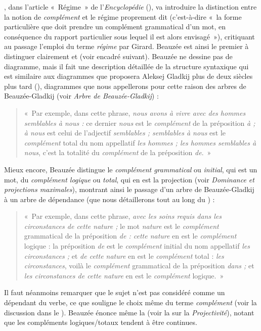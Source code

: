 {    , dans l’article «~Régime~» de l’\textit{Encyclopédie} (\citeyear{Beauzée1765}), va introduire la distinction entre la notion de \textit{complément} et le régime proprement dit (c’est-à-dire «~la forme particulière que doit prendre un complément grammatical d’un mot, en conséquence du rapport particulier sous lequel il est alors envisagé~»), critiquant au passage l’emploi du terme \textit{régime} par Girard. Beauzée est ainsi le premier à distinguer clairement  et  (voir encadré suivant). Beauzée ne dessine pas de diagramme, mais il fait une description détaillée de la structure syntaxique qui est similaire aux diagrammes que proposera Aleksej Gladkij plus de deux siècles plus tard (\citeyear{gladkij1968describing}), diagrammes que nous appellerons pour cette raison des arbres de Beauzée-Gladkij (voir  \textit{Arbre de Beauzée-Gladkij}) : 
    \begin{quote}
   «~Par exemple, dans cette phrase, \textit{nous avons à vivre avec des hommes semblables à nous :} ce dernier \textit{nous} est le \textit{complément} de la préposition \textit{à ; à nous} est celui de l’adjectif \textit{semblables ; semblables à nous} est le \textit{complément} total du nom appellatif \textit{les hommes ; les hommes semblables à nous}, c’est la totalité du \textit{complément} de la préposition \textit{de}.~»
 \end{quote}
    Mieux encore, Beauzée distingue le \textit{complément grammatical} ou \textit{initial}, qui est un mot, du \textit{complément logique} ou \textit{total}, qui en est la projection (voir  \textit{Dominance et projections maximales}), montrant ainsi le passage d’un arbre de Beauzée-Gladkij à un arbre de dépendance (que nous détaillerons tout au long du ) : 
    \begin{quote}
    «~Par exemple, dans cette phrase, \textit{avec les soins requis dans les circonstances de cette nature ;} le mot \textit{nature} est le \textit{complément} grammatical de la préposition \textit{de : cette nature} en est le \textit{complément} logique : la préposition \textit{de} est le \textit{complément} initial du nom appellatif \textit{les circonstances ;} et \textit{de cette nature} en est le \textit{complément} total : \textit{les circonstances}, voilà le \textit{complément} grammatical de la préposition \textit{dans ;} et \textit{les circonstances de cette nature} en est le \textit{complément} logique.~»
     \end{quote}
     Il faut néanmoins remarquer que le sujet n’est pas considéré comme un dépendant du verbe, ce que souligne le choix même du terme \textit{complément} (voir la discussion dans le ). Beauzée énonce même la  (voir la  sur la \textit{Projectivité}), notant que les compléments logiques/totaux tendent à être continues.

}
